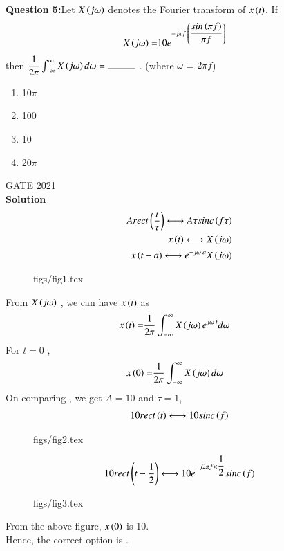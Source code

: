 \documentclass[journal,12pt,twocolumn]{IEEEtran}
\theoremstyle{remark}
\begin{document}
%
\textbf{Question 5:}Let $X\left(j \omega\right)$ denotes the Fourier transform of $x\left(t\right)$. If 
\begin{align}
X\left(j \omega\right) =& 10e^{-j\pi f \: \left(\dfrac{sin\left(\pi f\right)}{\pi f}\right)}
\end{align} 
then $ \dfrac{1}{2\pi} \int_{-\infty }^{\infty} X\brak{j \omega} d\omega = \rule{1cm}{0.15mm}$ .  (where $\omega$ = $2\pi f$)\\
\begin{enumerate}[label = \brak{\Alph*}]
\item 10$\pi$ \\
\item 100 \\
\item 10 \\
\item 20$\pi$ 
\end{enumerate}
\hfill GATE 2021\\
\textbf{Solution}  
\begin{align}
\label{eq : 2}A rect \left(\dfrac{t}{\tau}\right) \longleftrightarrow A \tau sinc\left(f\tau\right) \\
\label{eq : 3}x\left(t\right) \longleftrightarrow  X\left(j \omega\right) \\
\label{eq : 4}x\left(t-a\right) \longleftrightarrow e^{-j \omega \: a}X\left(j \omega\right)
\end{align}
\begin{figure}[ht]
	\centering
     {figs/fig1.tex}
    \label{fig: 2021.4.8.1}
    \caption{}
\end{figure}

From $X\left(j \omega\right)$ , we can have $x\left(t\right)$ as
\begin{align}
x\left(t\right) =& \dfrac{1}{2\pi} \int_{-\infty }^{\infty} X\left(j \omega\right) e^{j \omega \: t} d\omega
\end{align}
For $t=0$ ,
\begin{align}
x\left(0\right) =& \dfrac{1}{2\pi} \int_{-\infty }^{\infty} X\left(j \omega\right) d\omega
\end{align}
On comparing , we get $A = 10$ and $ \tau = 1$,
\begin{align}
10 rect \left(t\right) \longleftrightarrow 10  sinc\left(f\right) 
\end{align}
\begin{figure}[ht]
	\centering
     {figs/fig2.tex}
    \label{fig: 2021.4.8.2}
    \caption{}
\end{figure}
\begin{align}
10 rect \left(t-\dfrac{1}{2}\right) \longleftrightarrow 10e^{-j2\pi f \times \dfrac{1}{2}}sinc \left(f\right)
\end{align}
\begin{figure}[ht]
	\centering
     {figs/fig3.tex}
    \label{fig: 2021.4.8.3}
    \caption{}
\end{figure}

From the above figure, $x\left(0\right)$ is 10.\\
Hence, the correct option is .
\end{document}
